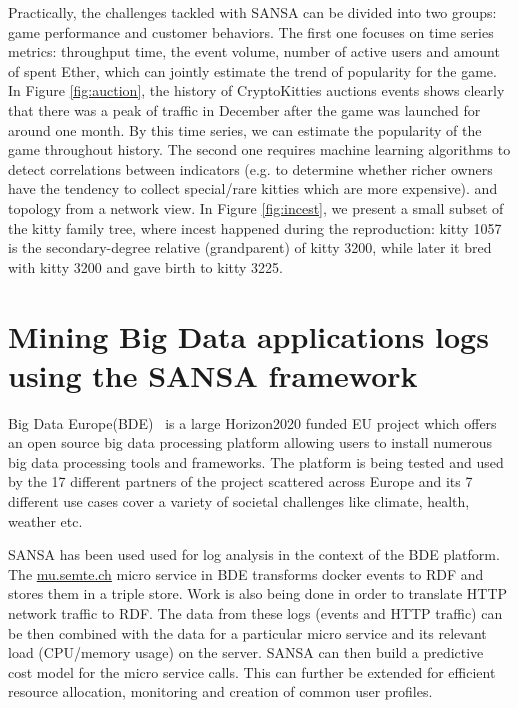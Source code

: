 Practically, the challenges tackled with SANSA can be divided into two groups: game performance and customer behaviors. The first one focuses on time series metrics: throughput time, the event volume, number of active users and amount of spent Ether, which can jointly estimate the trend of popularity for the game. In Figure \ref{fig:auction}, the history of CryptoKitties auctions events shows clearly that there was a peak of traffic in December after the game was launched for around one month. By this time series, we can estimate the popularity of the game throughout history.
The second one requires machine learning algorithms to detect correlations between indicators (e.g. to determine whether richer owners have the tendency to collect special/rare kitties which are more expensive). and topology from a network view. In Figure \ref{fig:incest}, we present a small subset of the kitty family tree, where incest happened during the reproduction: kitty 1057 is the secondary-degree relative (grandparent) of kitty 3200, while later it bred with kitty 3200 and gave birth to kitty 3225.


\section{Mining Big Data applications logs using the SANSA framework}
\label{sec:bde-use-case}
Big Data Europe(BDE)~\cite{Auer+ICWE-2017} is a large Horizon2020 funded EU project which offers an open source big data processing platform allowing users to install numerous big data processing tools and frameworks. 
The platform is being tested and used by the 17 different partners of the project scattered across Europe and its 7 different use cases cover a variety of societal challenges like climate, health, weather etc.

SANSA has been used used for log analysis in the context of the BDE platform.
The \url{mu.semte.ch} micro service in BDE transforms docker events to RDF and stores them in a triple store.
Work is also being done in order to translate HTTP network traffic to RDF. 
The data from these logs (events and HTTP traffic) can be then combined with the data for a particular micro service and its relevant load (CPU/memory usage) on the server. SANSA can then build a predictive cost model for the micro service calls. This can further be extended for efficient resource allocation, monitoring and creation of common user profiles.

